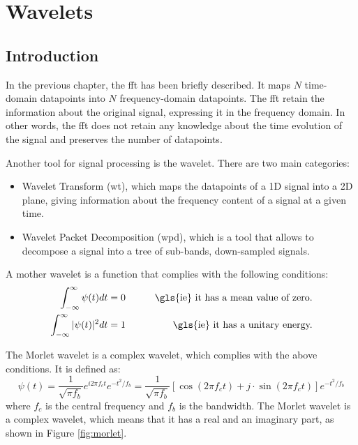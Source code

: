 \chapter{Wavelets}
\label{app:wavelet}

\section{Introduction}
In the previous chapter, the \gls{fft} has been briefly described. It maps $N$ time-domain datapoints into $N$ frequency-domain datapoints. The \gls{fft} retain the information about the original signal, expressing it in the frequency domain. In other words, the \gls{fft} does not retain any knowledge about the time evolution of the signal and preserves the number of datapoints.

Another tool for signal processing is the wavelet. There are two main categories:
\begin{itemize}
\item  Wavelet Transform (\gls{wt}), which maps the datapoints of a 1D signal into a 2D plane, giving information about the frequency content of a signal at a given time.
\item Wavelet Packet Decomposition (\gls{wpd}), which is a tool that allows to decompose a signal into a tree of sub-bands, down-sampled signals. 
\end{itemize}

A mother wavelet is a function that complies with the following conditions:
\begin{align}
\int_{-\infty}^{\infty} \psi(t) dt = 0 & \qquad &\text{\gls{ie} it has a mean value of zero.} \\
\int_{-\infty}^{\infty} |\psi(t)|^2 dt = 1 & \qquad &\text{\gls{ie} it has a unitary energy.}
\end{align}

The Morlet wavelet is a complex wavelet, which complies with the above conditions. It is defined as:
\begin{equation}
\psi(t) = \frac{1}{\sqrt{\pi f_b}} e^{i 2 \pi f_c t} e^{-t^2/f_b} =  \frac{1}{\sqrt{\pi f_b}}[ \cos(2 \pi f_c t) + j\cdot \sin(2 \pi f_c t)] e^{-t^2/f_b}
\end{equation}
where $f_c$ is the central frequency and $f_b$ is the bandwidth. The Morlet wavelet is a complex wavelet, which means that it has a real and an imaginary part, as shown in Figure \ref{fig:morlet}. 

